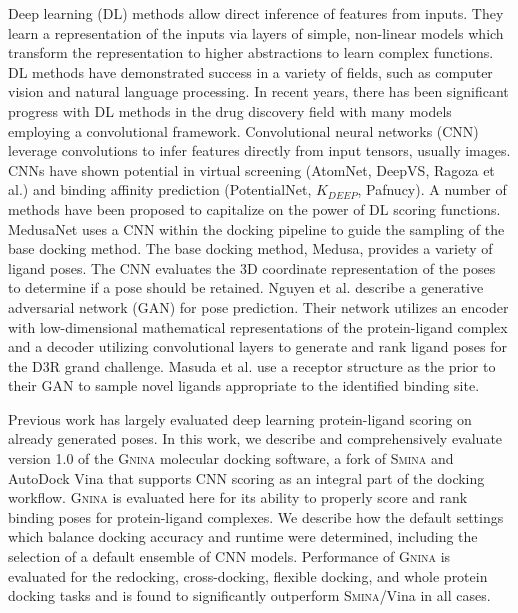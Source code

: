 \documentclass[linenumbers,doublespacing]{bmcart}
\begin{document}
Deep learning (DL) methods allow direct inference of features from inputs. They learn a representation of the inputs via layers of simple, non-linear models which transform the representation to higher abstractions to learn complex functions\cite{lecun2015deep}.  DL methods have demonstrated success in a variety of fields, such as computer vision and natural language processing\cite{krizhevsky2017imagenet,brown2020language}. In recent years, there has been significant progress with DL methods in the drug discovery field with many models employing a convolutional framework. Convolutional neural networks (CNN) leverage convolutions to infer features directly from input tensors, usually images. CNNs have shown potential in virtual screening (AtomNet\cite{wallach2015atomnet}, DeepVS\cite{pereira2016boosting}, Ragoza et al.\cite{Ragoza2017}) and binding affinity prediction (PotentialNet\cite{feinberg2018potentialnet}, $K_{DEEP}$\cite{jimenez2018k}, Pafnucy\cite{stepniewska2018development}). A number of methods have been proposed to capitalize on the power of DL scoring functions. MedusaNet uses a CNN within the docking pipeline to guide the sampling of the base docking method\cite{jiang2020guiding}. The base docking method, Medusa, provides a variety of ligand poses. The CNN evaluates the 3D coordinate representation of the poses to determine if a pose should be retained. Nguyen et al. \cite{nguyen2020mathdl} describe a generative adversarial network (GAN) for pose prediction. Their network utilizes an encoder with low-dimensional mathematical representations of the protein-ligand complex and a decoder utilizing convolutional layers to generate and rank ligand poses for the D3R grand challenge. Masuda et al.\cite{masuda2020generating} use a receptor structure as the prior to their GAN to sample novel ligands appropriate to the identified binding site.

Previous work has largely evaluated deep learning protein-ligand scoring on already generated poses.
In this work, we describe and comprehensively evaluate version 1.0 of the \textsc{Gnina} molecular docking software, a fork of \textsc{Smina}\cite{koes2013lessons} and AutoDock Vina\cite{trott2010autodock} that supports CNN scoring as an integral part of the docking workflow. \textsc{Gnina} is evaluated here for its ability to properly score and rank binding poses for protein-ligand complexes. We describe how the default settings which balance docking accuracy and runtime were determined, including the selection of a default ensemble of CNN models. Performance of \textsc{Gnina} is evaluated for the redocking, cross-docking, flexible docking, and whole protein docking tasks and is found to significantly outperform \textsc{Smina}/Vina in all cases.
\end{document}
